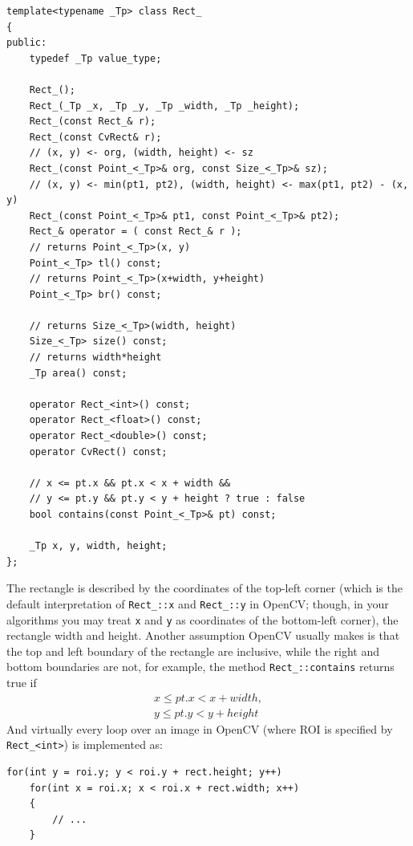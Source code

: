 \begin{lstlisting}
template<typename _Tp> class Rect_
{
public:
    typedef _Tp value_type;
    
    Rect_();
    Rect_(_Tp _x, _Tp _y, _Tp _width, _Tp _height);
    Rect_(const Rect_& r);
    Rect_(const CvRect& r);
    // (x, y) <- org, (width, height) <- sz
    Rect_(const Point_<_Tp>& org, const Size_<_Tp>& sz);
    // (x, y) <- min(pt1, pt2), (width, height) <- max(pt1, pt2) - (x, y)
    Rect_(const Point_<_Tp>& pt1, const Point_<_Tp>& pt2);
    Rect_& operator = ( const Rect_& r );
    // returns Point_<_Tp>(x, y)
    Point_<_Tp> tl() const;
    // returns Point_<_Tp>(x+width, y+height)
    Point_<_Tp> br() const;
    
    // returns Size_<_Tp>(width, height)
    Size_<_Tp> size() const;
    // returns width*height
    _Tp area() const;

    operator Rect_<int>() const;
    operator Rect_<float>() const;
    operator Rect_<double>() const;
    operator CvRect() const;

    // x <= pt.x && pt.x < x + width &&
    // y <= pt.y && pt.y < y + height ? true : false
    bool contains(const Point_<_Tp>& pt) const;

    _Tp x, y, width, height;
};
\end{lstlisting}

The rectangle is described by the coordinates of the top-left corner (which is the default interpretation of \texttt{Rect\_::x} and \texttt{Rect\_::y} in OpenCV; though, in your algorithms you may treat \texttt{x} and \texttt{y} as coordinates of the bottom-left corner), the rectangle width and height. Another assumption OpenCV usually makes is that the top and left boundary of the rectangle are inclusive, while the right and bottom boundaries are not, for example, the method \texttt{Rect\_::contains} returns true if
\begin{eqnarray*}
      x \leq pt.x < x+width,\\
      y \leq pt.y < y+height
\end{eqnarray*}
And virtually every loop over an image  in OpenCV (where ROI is specified by \texttt{Rect\_<int>}) is implemented as:
\begin{lstlisting}
for(int y = roi.y; y < roi.y + rect.height; y++)
    for(int x = roi.x; x < roi.x + rect.width; x++)
    {
        // ...
    }
\end{lstlisting}

